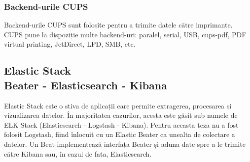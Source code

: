 \documentclass[12pt]{report}
\begin{document}
			\subsubsection{Backend-urile CUPS}
Backend-urile CUPS sunt folosite pentru a trimite datele către imprimante. CUPS pune la dispoziție multe backend-uri: paralel, serial, USB, cups-pdf, PDF virtual printing, JetDirect, LPD, SMB, etc.
		
		
		\subsection[Elastic Stack]{Elastic Stack\\ {\normalsize Beater - Elasticsearch - Kibana}}
Elastic Stack este o stiva de aplicații care permite extragerea, procesarea și vizualizarea datelor. În majoritatea cazurilor, acesta este găsit sub numele de ELK Stack (Elasticsearch - Logstash - Kibana). Pentru aceasta teza nu a fost folosit Logstash, fiind înlocuit cu un Elastic Beater ca unealta de colectare a datelor. Un Beat implementează interfața Beater și aduna date spre a le trimite către Kibana sau, în cazul de fata, Elasticsearch.
\end{document}
